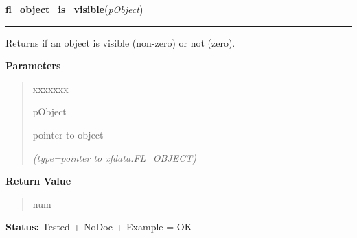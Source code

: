     \label{xformslib:library:fl_object_is_visible}

    \vspace{0.5ex}

\hspace{.8\funcindent}\begin{boxedminipage}{\funcwidth}

    \raggedright \textbf{fl\_object\_is\_visible}(\textit{pObject})

    \vspace{-1.5ex}

    \rule{\textwidth}{0.5\fboxrule}
\setlength{\parskip}{2ex}
    Returns if an object is visible (non-zero) or not (zero).

\setlength{\parskip}{1ex}
      \textbf{Parameters}
      \vspace{-1ex}

      \begin{quote}
        \begin{Ventry}{xxxxxxx}

          \item[pObject]

          pointer to object

            {\it (type=pointer to xfdata.FL\_OBJECT)}

        \end{Ventry}

      \end{quote}

      \textbf{Return Value}
    \vspace{-1ex}

      \begin{quote}
      num

      \end{quote}

\textbf{Status:} Tested + NoDoc + Example = OK



    \end{boxedminipage}

    \label{xformslib:library:fl_free_object}

    \vspace{0.5ex}

